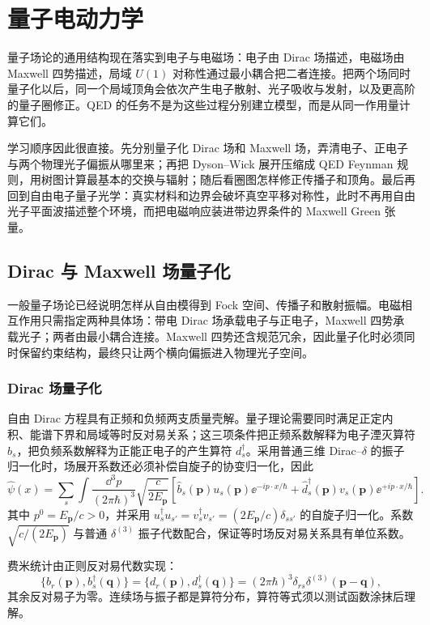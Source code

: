 \chapter{量子电动力学}\label{chap:qed}

量子场论的通用结构现在落实到电子与电磁场：电子由 Dirac 场描述，电磁场由 Maxwell 四势描述，局域 $U(1)$ 对称性通过最小耦合把二者连接。把两个场同时量子化以后，同一个局域顶角会依次产生电子散射、光子吸收与发射，以及更高阶的量子圈修正。QED 的任务不是为这些过程分别建立模型，而是从同一作用量计算它们。

学习顺序因此很直接。先分别量子化 Dirac 场和 Maxwell 场，弄清电子、正电子与两个物理光子偏振从哪里来；再把 Dyson--Wick 展开压缩成 QED Feynman 规则，用树图计算最基本的交换与辐射；随后看圈图怎样修正传播子和顶角。最后再回到自由电子量子光学：真实材料和边界会破坏真空平移对称性，此时不再用自由光子平面波描述整个环境，而把电磁响应装进带边界条件的 Maxwell Green 张量。

\section{Dirac 与 Maxwell 场量子化}

一般量子场论已经说明怎样从自由模得到 Fock 空间、传播子和散射振幅。电磁相互作用只需指定两种具体场：带电 Dirac 场承载电子与正电子，Maxwell 四势承载光子；两者由最小耦合连接。Maxwell 四势还含规范冗余，因此量子化时必须同时保留约束结构，最终只让两个横向偏振进入物理光子空间。

\subsection{Dirac 场量子化}

\begin{definition}
自由 Dirac 方程具有正频和负频两支质量壳解。量子理论需要同时满足正定内积、能谱下界和局域等时反对易关系；这三项条件把正频系数解释为电子湮灭算符 $b_s$，把负频系数解释为正能正电子的产生算符 $d_s^\dagger$。采用普通三维 Dirac--$\delta$ 的振子归一化时，场展开系数还必须补偿自旋子的协变归一化，因此
\begin{equation}
\boxed{
\hat\psi(x)
=\sum_s\int\frac{\dd^3 p}{(2\pi\hbar)^3}\sqrt{\frac{c}{2E_{\mathbf p}}}
\left[
\hat b_s(\mathbf p)u_s(\mathbf p)\ee^{-ip\cdot x/\hbar}
+\hat d_s^\dagger(\mathbf p)v_s(\mathbf p)\ee^{+ip\cdot x/\hbar}
\right].}
\label{eq:dirac-field-exp-r2}
\end{equation}
其中 $p^0=E_{\mathbf p}/c>0$，并采用 $u_s^\dagger u_{s'}=v_s^\dagger v_{s'}=(2E_{\mathbf p}/c)\delta_{ss'}$ 的自旋子归一化。系数 $\sqrt{c/(2E_{\mathbf p})}$ 与普通 $\delta^{(3)}$ 振子代数配合，保证等时场反对易关系具有单位系数。

费米统计由正则反对易代数实现：
\begin{equation}
\boxed{
\{b_r(\mathbf p),b_s^\dagger(\mathbf q)\}
=\{d_r(\mathbf p),d_s^\dagger(\mathbf q)\}
=(2\pi\hbar)^3\delta_{rs}\delta^{(3)}(\mathbf p-\mathbf q),}
\label{eq:fermion-anticomm-normalization-r2}
\end{equation}
其余反对易子为零。连续场与振子都是算符分布，算符等式须以测试函数涂抹后理解。
\end{definition}


